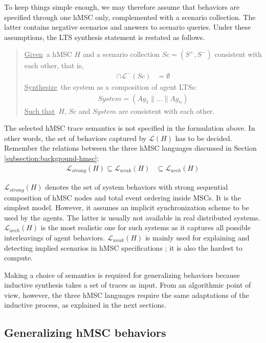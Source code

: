 To keep things simple enough, we may therefore assume that behaviors are specified through one hMSC only, complemented with a scenario collection. The latter contains negative scenarios and answers to scenario queries. Under these assumptions, the LTS synthesis statement is restated as follows.

\begin{quote}
\underline{Given}~a hMSC $H$ and a scenario collection $Sc = (S^+,S^-)$ consistent with each other, that is,
\begin{align*}
[\mathcal{L}^+(Sc) \cup \mathcal{L}(H)] \cap \mathcal{L}^-(Sc) &= \emptyset
\end{align*}
\underline{Synthesize}~the system as a composition of agent LTSs:
\begin{align*}
System = (Ag_1 \parallel \ldots \parallel Ag_n)
\end{align*}
\underline{Such that}~$H$, $Sc$ and $System$ are consistent with each other.
\end{quote}

The selected hMSC trace semantics is not specified in the formulation above. In other words, the set of behaviors captured by $\mathcal{L}(H)$ has to be decided. Remember the relations between the three hMSC languages discussed in Section \ref{subsection:background-hmsc}: 
\begin{align}
\mathcal{L}_{strong}(H) \subseteq \mathcal{L}_{weak}(H) &\subseteq \mathcal{L}_{arch}(H)
\end{align}

$\mathcal{L}_{strong}(H)$ denotes the set of system behaviors with strong sequential composition of hMSC nodes and total event ordering inside MSCs. It is the simplest model. However, it assumes an implicit synchronization scheme to be used by the agents. The latter is usually not available in real distributed systems. $\mathcal{L}_{arch}(H)$ is the most realistic one for such systems as it captures all possible interleavings of agent behaviors. $\mathcal{L}_{weak}(H)$ is mainly used for explaining and detecting implied scenarios in hMSC specifications \cite{Uchitel:2003}; it is also the hardest to compute.

Making a choice of semantics is required for generalizing behaviors because inductive synthesis takes a set of traces as input. From an algorithmic point of view, however, the three hMSC languages require the same adaptations of the inductive process, as explained in the next sections.

\subsection{Generalizing hMSC behaviors\label{subsection:hmsc-induction-algo-adaptation}}

